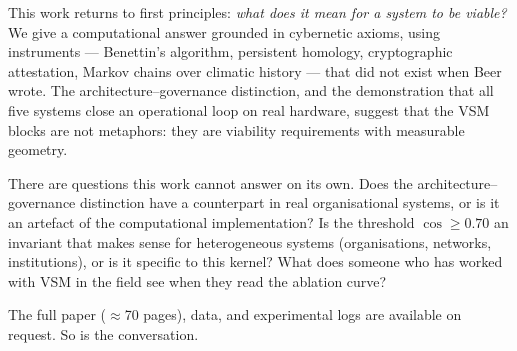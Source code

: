 \documentclass[11pt, a4paper]{article}
\begin{document}
This work returns to first principles: \emph{what does it mean for a system to be
viable?} We give a computational answer grounded in cybernetic axioms, using
instruments --- Benettin's algorithm, persistent homology, cryptographic attestation,
Markov chains over climatic history --- that did not exist when Beer wrote. The
architecture--governance distinction, and the demonstration that all five systems
close an operational loop on real hardware, suggest that the VSM blocks are not
metaphors: they are viability requirements with measurable geometry.

There are questions this work cannot answer on its own. Does the
architecture--governance distinction have a counterpart in real organisational
systems, or is it an artefact of the computational implementation? Is the threshold
$\cos \geq 0{.}70$ an invariant that makes sense for heterogeneous systems
(organisations, networks, institutions), or is it specific to this kernel? What does
someone who has worked with VSM in the field see when they read the ablation curve?

The full paper ($\approx$70 pages), data, and experimental logs are available on
request. So is the conversation.
\end{document}

